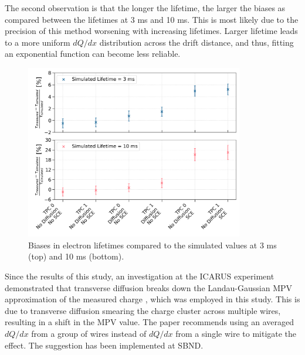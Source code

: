 The second observation is that the longer the lifetime, the larger the biases as compared between the lifetimes at 3 ms and 10 ms.
This is most likely due to the precision of this method worsening with increasing lifetimes.
Larger lifetime leads to a more uniform $dQ/dx$ distribution across the drift distance, and thus, fitting an exponential function can become less reliable.

\begin{figure}[b!] 
\centering    
\includegraphics[width=0.85\textwidth]{etime_biases_compare}
\caption[Electron Lifetime Measurement Biases]{
Biases in electron lifetimes compared to the simulated values at 3 ms (top) and 10 ms (bottom).
}
\label{fig:etime_biases_compare}
\end{figure}

Since the results of this study, an investigation at the ICARUS experiment demonstrated that transverse diffusion breaks down the Landau-Gaussian MPV approximation of the measured charge \cite{GrayDiffusion}, which was employed in this study.
This is due to transverse diffusion smearing the charge cluster across multiple wires, resulting in a shift in the MPV value. 
The paper recommends using an averaged $dQ/dx$ from a group of wires instead of $dQ/dx$ from a single wire to mitigate the effect.
The suggestion has been implemented at SBND.

